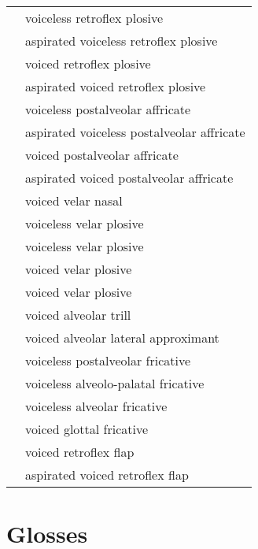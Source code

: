 \documentclass{article}
\begin{document}
\begin{xltabular}{\textwidth}{lL}
   & voiceless retroflex plosive \\
   & aspirated voiceless retroflex plosive \\
   & voiced retroflex plosive \\
   & aspirated voiced retroflex plosive \\
  \ipa{\t{\textteshlig}} & voiceless postalveolar affricate \\
   & aspirated voiceless postalveolar affricate \\
  \ipa{\t{\textdyoghlig}} & voiced postalveolar affricate \\
   & aspirated voiced postalveolar affricate \\
   & voiced velar nasal \\
   & voiceless velar plosive \\
   & voiceless velar plosive \\
   & voiced velar plosive \\
   & voiced velar plosive \\
   & voiced alveolar trill \\
   & voiced alveolar lateral approximant \\
   & voiceless postalveolar fricative \\
   & voiceless alveolo-palatal fricative \\
   & voiceless alveolar fricative \\
   & voiced glottal fricative \\
   & voiced retroflex flap \\
   & aspirated voiced retroflex flap \\
\end{xltabular}

\newpage\section{Glosses}
\end{document}
